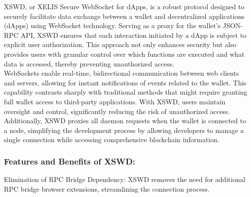\documentclass[10pt,a4paper,twocolumn]{article}
\begin{document}
XSWD, or XELIS Secure WebSocket for dApps, is a robust protocol designed to securely facilitate data exchange between a wallet and decentralized applications (dApps) using WebSocket technology. Serving as a proxy for the wallet's JSON-RPC API, XSWD ensures that each interaction initiated by a dApp is subject to explicit user authorization. This approach not only enhances security but also provides users with granular control over which functions are executed and what data is accessed, thereby preventing unauthorized access.\\

WebSockets enable real-time, bidirectional communication between web clients and servers, allowing for instant notifications of events related to the wallet. This capability contrasts sharply with traditional methods that might require granting full wallet access to third-party applications. With XSWD, users maintain oversight and control, significantly reducing the risk of unauthorized access.\\

Additionally, XSWD proxies all daemon requests when the wallet is connected to a node, simplifying the development process by allowing developers to manage a single connection while accessing comprehensive blockchain information.\\

\subsubsection{Features and Benefits of XSWD:}

Elimination of RPC Bridge Dependency: XSWD removes the need for additional RPC bridge browser extensions, streamlining the connection process.\\
\end{document}
